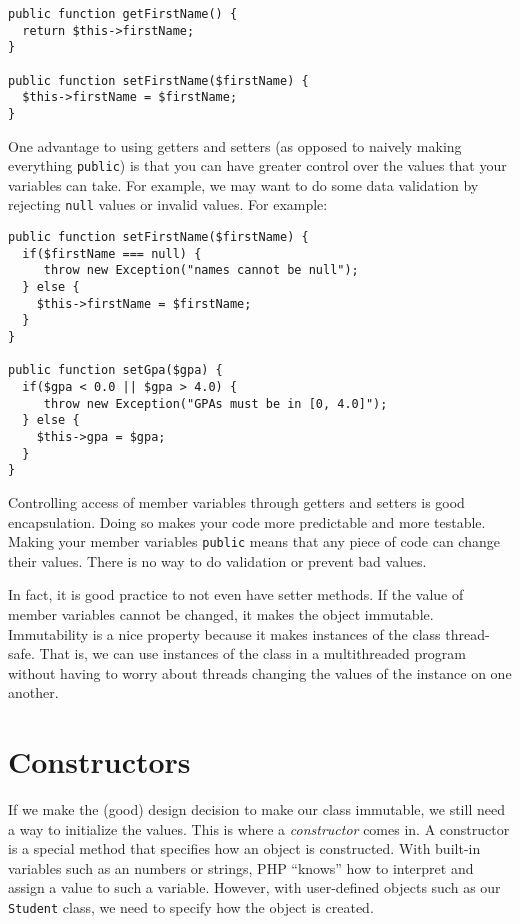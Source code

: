 \begin{verbatim}
public function getFirstName() {
  return $this->firstName;
}

public function setFirstName($firstName) {
  $this->firstName = $firstName;
} 
\end{verbatim}

One advantage to using getters and setters (as opposed to naively
making everything \texttt{public}) is that you can have 
greater control over the values that your variables can take.  For 
example, we may want to do some data validation by rejecting
\texttt{null} values or invalid values.  For example:

\begin{verbatim}
public function setFirstName($firstName) {
  if($firstName === null) {
     throw new Exception("names cannot be null");
  } else {
    $this->firstName = $firstName;
  }
} 

public function setGpa($gpa) {
  if($gpa < 0.0 || $gpa > 4.0) {
     throw new Exception("GPAs must be in [0, 4.0]");
  } else {
    $this->gpa = $gpa;
  }
} 
\end{verbatim}

Controlling access of member variables through getters and setters
is good encapsulation.  Doing so makes your code more predictable and
more testable.  Making your member variables \texttt{public}
means that any piece of code can change their values.  There is no
way to do validation or prevent bad values.  

In fact, it is good practice to not even have setter methods.  If 
the value of member variables cannot be changed, it makes the object
\gls{immutable}.  Immutability is a nice property because it makes 
instances of the class thread-safe.  That is, we can use instances of the class in a multithreaded program without having to worry about threads changing the values of the instance on one another.  

\section{Constructors}

If we make the (good) design decision to make our class immutable,
we still need a way to initialize the values.  This is where 
a \emph{constructor} comes in.  A constructor is a special method
that specifies how an object is constructed.  With built-in
variables such as an numbers or strings, PHP ``knows'' how to 
interpret and assign a value to such a variable.  However, with 
user-defined objects such as our \texttt{Student} class, 
we need to specify how the object is created.

